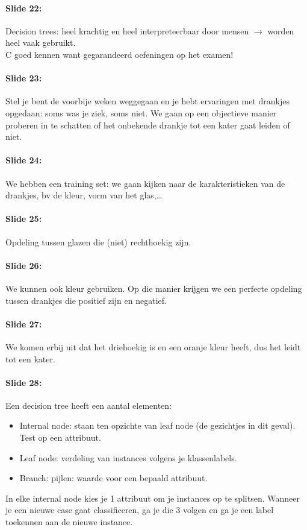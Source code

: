 \documentclass[10pt,a4paper]{report}
\begin{document}
\paragraph{Slide 22:}Decision trees: heel krachtig en heel interpreteerbaar door mensen $\rightarrow$ worden heel vaak gebruikt.\\
C goed kennen want gegarandeerd oefeningen op het examen!

\paragraph{Slide 23:}Stel je bent de voorbije weken weggegaan en je hebt ervaringen met drankjes opgedaan: soms was je ziek, soms niet. We gaan op een objectieve manier proberen in te schatten of het onbekende drankje tot een kater gaat leiden of niet.

\paragraph{Slide 24:}We hebben een training set: we gaan kijken naar de karakteristieken van de drankjes, bv de kleur, vorm van het glas,… 

\paragraph{Slide 25:}Opdeling tussen glazen die (niet) rechthoekig zijn.

\paragraph{Slide 26:}We kunnen ook kleur gebruiken. Op die manier krijgen we een perfecte opdeling tussen drankjes die positief zijn en negatief.

\paragraph{Slide 27:}We komen erbij uit dat het driehoekig is en een oranje kleur heeft, dus het leidt tot een kater.

\paragraph{Slide 28:}Een decision tree heeft een aantal elementen:
\begin{itemize}
\item Internal node: staan ten opzichte van leaf node (de gezichtjes in dit geval). Test op een attribuut.
\item Leaf node: verdeling van instances volgens je klassenlabels.
\item Branch: pijlen: waarde voor een bepaald attribuut.
\end{itemize}
In elke internal node kies je 1 attribuut om je instances op te splitsen. Wanneer je een nieuwe case gaat classificeren, ga je die 3 volgen en ga je een label toekennen aan de nieuwe instance.
\end{document}
